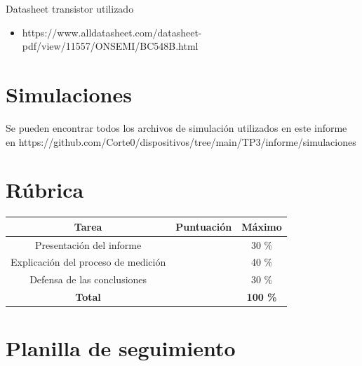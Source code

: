 Datasheet transistor utilizado
\begin{itemize}
  \item https://www.alldatasheet.com/datasheet-pdf/view/11557/ONSEMI/BC548B.html
\end{itemize}

\section{Simulaciones}
\label{con:simulaciones}
Se pueden encontrar todos los archivos de simulación utilizados en este informe en https://github.com/Corte0/dispositivos/tree/main/TP3/informe/simulaciones

\section{Rúbrica}

\begin{table}[H]
  \centering
  \begin{tabular}{|c|c|c|}
    \hline
    \rowcolor[gray]{0.8}
    \textbf{Tarea} & \textbf{Puntuación} & \textbf{Máximo} \\
    \hline
    Presentación del informe & & 30 \% \\
    \hline
    Explicación del proceso de medición & & 40 \% \\
    \hline
    Defensa de las conclusiones & & 30 \% \\
    \hline
    \textbf{Total} & & \textbf{100 \%} \\
    \hline
  \end{tabular}
\end{table}

\section{Planilla de seguimiento}

